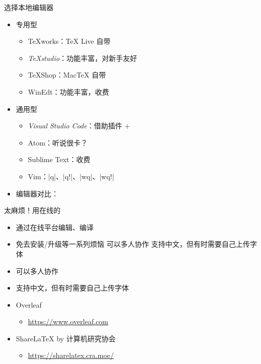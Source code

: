 \begin{frame}[fragile]{选择本地编辑器}
  \begin{itemize}
    \item<+-> 专用型
  
      \begin{itemize}
        \item TeXworks：\TeX{} Live 自带 \faWindows{} \faApple{} \faLinux{}
        \item \emph{TeXstudio}：功能丰富，对新手友好 \faWindows{} \faApple{} \faLinux{}
        \item TeXShop：Mac\TeX{} 自带 \faApple{}
        \item WinEdt：功能丰富，收费 \faWindows{}
      \end{itemize}
  
    \item<+-> 通用型
  
      \begin{itemize}
        \item \emph{Visual Studio Code}：借助插件   + 
        \item Atom：听说很卡？
        \item Sublime Text：收费
        \item Vim：|q|、|q!|、|wq|、|wq!|
      \end{itemize}

    \item<+-> 编辑器对比：
  \end{itemize}
\end{frame}


\begin{frame}[fragile]{太麻烦！用在线的}

    \begin{itemize}
        \item 通过在线平台编辑、编译
        \item 免去安装/升级等一系列烦恼 可以多人协作 支持中文，但有时需要自己上传字体
        \item 可以多人协作
        \item 支持中文，但有时需要自己上传字体
    \end{itemize}

    \begin{itemize}
      \item Overleaf
      \begin{itemize}
          \item \url{https://www.overleaf.com}
      \end{itemize}
      \item ShareLaTeX by 计算机研究协会
      \begin{itemize}
        \item \url{https://sharelatex.cra.moe/}
    \end{itemize}
      \end{itemize}
  \end{frame}

